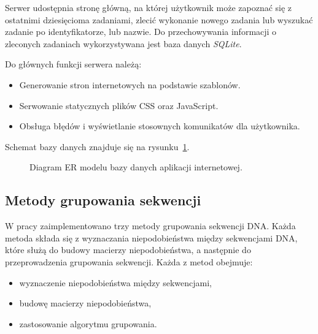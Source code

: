             Serwer udostępnia stronę główną, na której użytkownik może zapoznać się z ostatnimi dziesięcioma zadaniami, zlecić wykonanie nowego zadania lub wyszukać zadanie po identyfikatorze, lub nazwie. Do przechowywania informacji o zleconych zadaniach wykorzystywana jest baza danych \textit{SQLite}.
            
            Do głównych funkcji serwera należą:
            \begin{itemize}
                \item Generowanie stron internetowych na podstawie szablonów.
                \item Serwowanie statycznych plików CSS oraz JavaScript.
                \item Obsługa błędów i wyświetlanie stosownych komunikatów dla użytkownika.
            \end{itemize}
            
            Schemat bazy danych znajduje się na rysunku~\ref{Picture:App:Database}.

            \begin{figure}
                \begin{center}
                    
                \end{center}
                \caption{
                    Diagram ER modelu bazy danych aplikacji internetowej.
                }\label{Picture:App:Database}
            \end{figure}

    \subsection{Metody grupowania sekwencji}

        W pracy zaimplementowano trzy metody grupowania sekwencji DNA. Każda metoda składa się z wyznaczania niepodobieństwa między sekwencjami DNA, które służą do budowy macierzy niepodobieństwa, a następnie do przeprowadzenia grupowania sekwencji. Każda z metod obejmuje:

        \begin{itemize}
            \item {wyznaczenie niepodobieństwa między sekwencjami,}
            \item {budowę macierzy niepodobieństwa,}
            \item {zastosowanie algorytmu grupowania.}
        \end{itemize}

